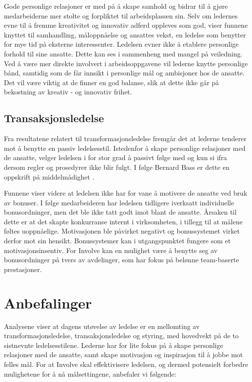 \indent \newline
Gode personlige relasjoner er med på å skape samhold og bidrar til å gjøre medarbeiderne mer stolte og forpliktet til arbeidsplassen sin. Selv om ledernes evne til å fremme kreativitet og innovativ adferd oppleves som god, viser funnene knyttet til samhandling, måloppnåelse og ansattes vekst, en ledelse som benytter for mye tid på eksterne interessenter. Ledelsen evner ikke å etablere personlige forhold til sine ansatte. Dette kan ses i sammenheng med mangel på veiledning. Ved å være mer direkte involvert i arbeidsoppgavene vil lederne knytte personlige bånd, samtidig som de får innsikt i personlige mål og ambisjoner hos de ansatte. Det vil være viktig at de finner en god balanse, slik at dette ikke går på bekostning av kreativ - og innovativ frihet.

\subsection{Transaksjonsledelse}
Fra resultatene relatert til transformasjonsledelse fremgår det at lederne tenderer mot å benytte en passiv ledelsesstil. Istedenfor å skape personlige relasjoner med de ansatte, velger ledelsen i for stor grad å passivt følge med og kun si ifra dersom regler og prosedyrer ikke blir fulgt. I følge Bernard Bass er dette en oppskrift på middelmådighet  \cite[s.~74]{PerspektiverLedelse}.

\indent \newline
Funnene viser videre at ledelsen ikke har for vane å motivere de ansatte ved bruk av bonuser. I følge medarbeideren har ledelsen tidligere iverksatt individuelle bonusordninger, men det ble ikke tatt godt imot blant de ansatte. Årsaken til dette er at det skapte konkurranse internt i virksomheten, i tillegg til at målene føltes uoppnåelige. Motivasjonen ble påvirket negativt og bonussystemet virket derfor mot sin hensikt. Bonussystemer kan i utgangspunktet fungere som et motivasjonsinsentiv. For Involve kan en mulighet være å benytte seg av bonusordninger på tvers av avdelinger, som har fokus på belønne team-baserte prestasjoner. 

\section{Anbefalinger}
Analysene viser at dagens utøvelse av ledelse er en mellomting av transformasjonsledelse, transaksjonsledelse og styring, med hovedvekt på de to sistnevnte ledelsesstilene. Lederne har for lite fokus på å skape personlige relasjoner med de ansatte, samt skape motivasjon og inspirasjon til å jobbe mot felles mål. For at Involve skal effektivisere ledelsen, og dermed potensielt forbedre mulighetene for å nå målsettingene, anbefaler vi følgende:

